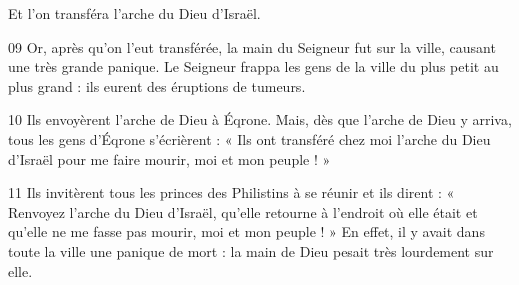 Et l’on transféra l’arche du Dieu d’Israël.

09 Or, après qu’on l’eut transférée, la main du Seigneur fut sur la ville, causant une très grande panique. Le Seigneur frappa les gens de la ville du plus petit au plus grand : ils eurent des éruptions de tumeurs.

10 Ils envoyèrent l’arche de Dieu à Éqrone. Mais, dès que l’arche de Dieu y arriva, tous les gens d’Éqrone s’écrièrent : « Ils ont transféré chez moi l’arche du Dieu d’Israël pour me faire mourir, moi et mon peuple ! »

11 Ils invitèrent tous les princes des Philistins à se réunir et ils dirent : « Renvoyez l’arche du Dieu d’Israël, qu’elle retourne à l’endroit où elle était et qu’elle ne me fasse pas mourir, moi et mon peuple ! » En effet, il y avait dans toute la ville une panique de mort : la main de Dieu pesait très lourdement sur elle.
